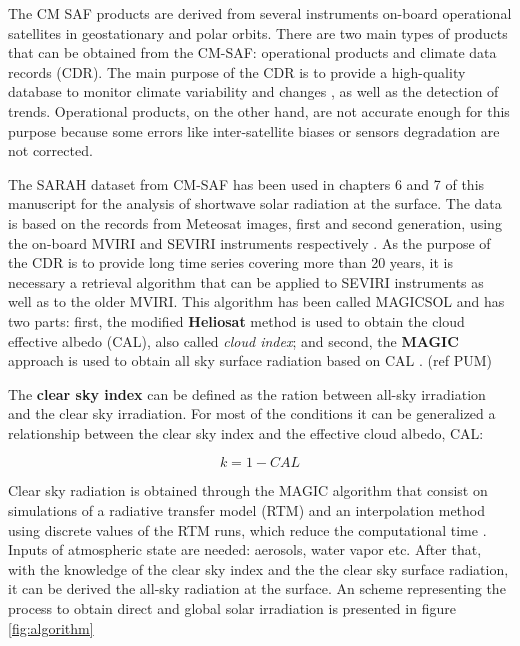 The CM SAF products are derived from several instruments on-board operational satellites in geostationary and polar orbits. There are two main types of products that can be obtained from the CM-SAF: operational products and climate data records (CDR). The main purpose of the CDR is to provide a high-quality database to monitor climate variability and changes \cite*{Muller2015}, as well as the detection of trends. Operational products, on the other hand, are not accurate enough for this purpose because some errors like inter-satellite biases or sensors degradation are not corrected.

The SARAH dataset from CM-SAF has been used in chapters 6 and 7 of this manuscript for the analysis of shortwave solar radiation at the surface. The data is based on the records from Meteosat images, first and second generation, using the on-board MVIRI and SEVIRI instruments respectively \cite*{Posselt2012}. As the purpose of the CDR is to provide long time series covering more than 20 years, it is necessary a retrieval algorithm that can be applied to SEVIRI instruments as well as to the older MVIRI. This algorithm has been called MAGICSOL and has two parts: first, the modified \textbf{Heliosat} method is used to obtain the cloud effective albedo (CAL), also called \textit{cloud index};  and second, the \textbf{MAGIC} approach is used to obtain all sky surface radiation based on CAL \cite*{Posselt2012}. (ref PUM)

The \textbf{clear sky index} can be defined as the ration between all-sky irradiation and the clear sky irradiation. For most of the conditions it can be generalized a relationship between the clear sky index and the effective cloud albedo, CAL:

\begin{equation}
  k=1-CAL
\end{equation}

Clear sky radiation is obtained through the MAGIC algorithm \cite*{mueller2009} that consist on simulations of a radiative transfer model (RTM) and an interpolation method using discrete values of the RTM runs, which reduce the computational time \cite*{mueller2009}. Inputs of atmospheric state are needed: aerosols, water vapor etc. After that, with the knowledge of the clear sky index and the the clear sky surface radiation, it can be derived the all-sky radiation at the surface. An scheme representing the process to obtain direct and global solar irradiation is presented in figure \ref{fig:algorithm}\\

